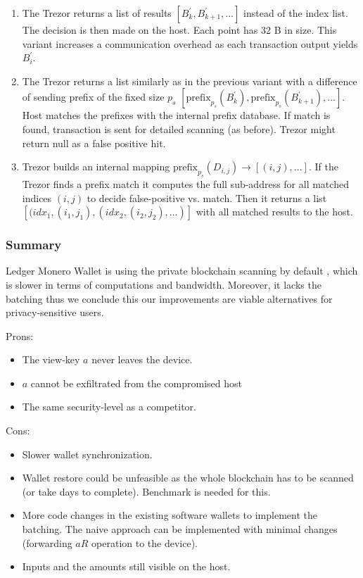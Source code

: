 \documentclass[]{article}
\begin{document}
\begin{enumerate}
	\item The Trezor returns a list of results $\left[B^{\prime}_k, B^{\prime}_{k+1}, \dots\right]$ instead of the index list. The decision is then made on the host. Each point has 32 B in size. This variant increases a communication overhead as each transaction output yields $B^{\prime}_i$.
	
	\item The Trezor returns a list similarly as in the previous variant with a difference of sending prefix of the fixed size $p_s$
	$\left[\text{prefix}_{p_s}\left(B^{\prime}_k\right), \text{prefix}_{p_s}\left(B^{\prime}_{k+1}\right), \dots\right]$. Host matches the prefixes with the internal prefix database. If match is found, transaction is sent for detailed scanning (as before). Trezor might return null as a false positive hit.
	
	\item Trezor builds an internal mapping $\text{prefix}_{p_s}\left(D_{i,j}\right) \rightarrow \left[(i, j), \dots\right]$.
	If the Trezor finds a prefix match it computes the full sub-address for all matched indices $(i,j)$ to decide false-positive vs. match. Then it returns a list $\left[(idx_1, (i_1, j_1), (idx_2, (i_2, j_2), \dots)\right]$ with all matched results to the host. 
	
\end{enumerate}

\subsubsection{Summary}
Ledger Monero Wallet is using the private blockchain scanning by default \cite{ledger_doc}, which is slower in terms of computations and bandwidth. Moreover, it lacks the batching thus we conclude this our improvements are viable alternatives for privacy-sensitive users.

\noindent Prons:
\begin{itemize}
	\item The view-key $a$ never leaves the device.
	\item $a$ cannot be exfiltrated from the compromised host
	\item The same security-level as a competitor.
\end{itemize}

\noindent Cons:
\begin{itemize}
	\item Slower wallet synchronization.
	\item Wallet restore could be unfeasible as the whole blockchain has to be scanned (or take days to complete). Benchmark is needed for this.
	\item More code changes in the existing software wallets to implement the batching. The naive approach can be implemented with minimal changes (forwarding $aR$ operation to the device).
	\item Inputs and the amounts still visible on the host.
\end{itemize}
\end{document}
